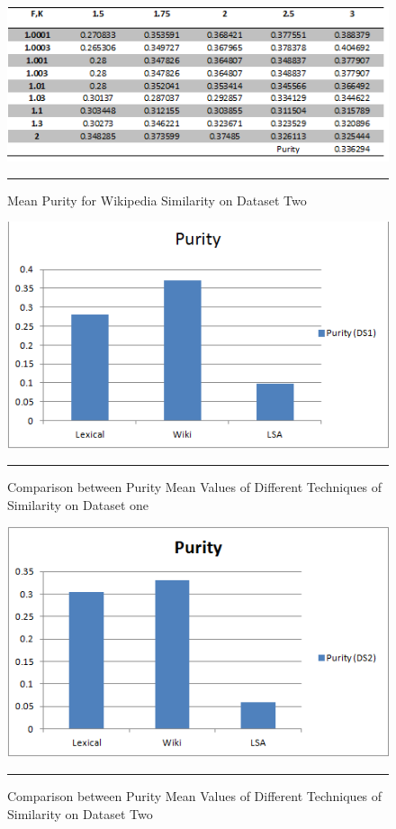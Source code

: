 \begin{figure}[htbp]
	\centering
		\includegraphics{./Figures/wiki_Purity_DS2.png}
		\rule{35em}{0.5pt}
	\caption[Mean Purity for Wikipedia Similarity on Dataset one]{Mean Purity for Wikipedia Similarity on Dataset Two}
	\label{fig:F8}
\end{figure}
\begin{figure}[htbp]
	\centering
		\includegraphics{./Figures/Purity_DS1.png}
		\rule{35em}{0.5pt}
	\caption[Comparison between Purity Mean Values of Different Techniques of Similarity on Dataset one]{Comparison between Purity Mean Values of Different Techniques of Similarity on Dataset one}
	\label{fig:F10}
\end{figure}
\begin{figure}[htbp]
	\centering
		\includegraphics{./Figures/Purity_DS2.png}
		\rule{35em}{0.5pt}
	\caption[Comparison between Purity Mean Values of Different Techniques of Similarity on Dataset Two]{Comparison between Purity Mean Values of Different Techniques of Similarity on Dataset Two}
	\label{fig:F11}
\end{figure}


